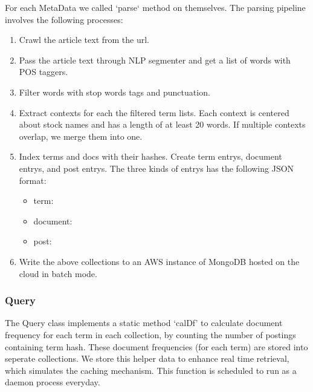 \documentclass{article}
\begin{document}
For each MetaData we called `parse` method on themselves. The parsing pipeline involves the following processes:
\begin{enumerate}
  \item Crawl the article text from the url.
  \item Pass the article text through NLP segmenter and get a list of words with POS taggers.
  \item Filter words with stop words tags and punctuation.
  \item Extract contexts for each the filtered term lists. Each context is centered about stock names and has a length of at least 20 words. If multiple contexts overlap, we merge them into one.
  \item Index terms and docs with their hashes. Create term entrys, document entrys, and post entrys. The three kinds of entrys has the following JSON format:
  \begin{itemize}
    \item term: \par
      \texttt{} \par
    \item document:\par
      \texttt{} \par
      \texttt{} \par
      \texttt{} \par
      \texttt{}\par
    \item post:\par
      \texttt{}\par
      \texttt{}
  \end{itemize}
  \item Write the above collections to an AWS instance of MongoDB hosted on the cloud in batch mode. 
\end{enumerate}

\subsubsection{Query}
The Query class implements a static method `calDf' to calculate document frequency for each term in each collection, by counting the number of postings containing term hash. These document frequencies (for each term) are stored into seperate collections. We store this helper data to enhance real time retrieval, which simulates the caching mechanism. This function is scheduled to run as a daemon process everyday.
\end{document}
